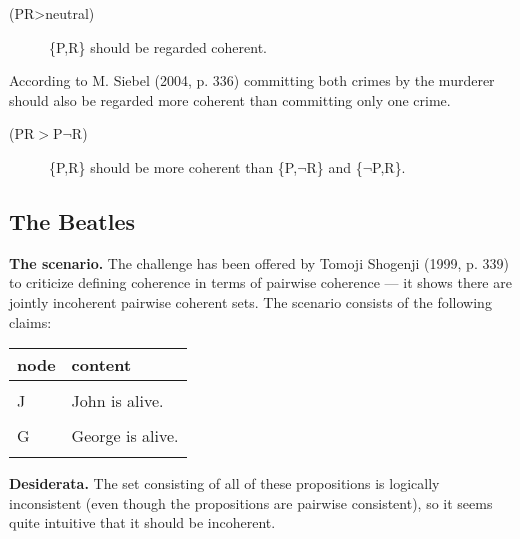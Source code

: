 \documentclass[10pt,]{scrartcl}
\newcommand{\s}[1]{\mbox{\textsf{#1}}}
\begin{document}
\begin{description}
    \item[(\s{PR}\textgreater \s{neutral})] \{\s{P,R}\} should be regarded coherent. 
\end{description}

\vspace{2mm}

According to M. Siebel (2004, p. 336) committing both crimes by the
murderer should also be regarded more coherent than committing only one
crime. \vspace{2mm}

\begin{description}
    \item[(\s{PR}$>$\s{P}$\neg$\s{R})] \{\s{P,R}\} should be more coherent than \{\s{P},$\neg$\s{R}\} and \{$\neg$\s{P},\s{R}\}.
\end{description}

\vspace{2mm}

\subsection{The Beatles}

\textbf{The scenario.} The challenge has been offered by Tomoji Shogenji
(1999, p. 339) to criticize defining coherence in terms of pairwise
coherence --- it shows there are jointly incoherent pairwise coherent
sets. The scenario consists of the following claims:

\begin{table}[H]
\centering
\begin{tabular}{ll}
\toprule
node & content\\
\midrule
\cellcolor{gray!6}{D} & \cellcolor{gray!6}{Exactly one of the Beatles (John, Paul, George and Ringo) is dead.}\\
J & John is alive.\\
\cellcolor{gray!6}{P} & \cellcolor{gray!6}{Paul is alive.}\\
G & George is alive.\\
\cellcolor{gray!6}{R} & \cellcolor{gray!6}{Ringo is alive.}\\
\bottomrule
\end{tabular}
\end{table}

\noindent  \textbf{Desiderata.} The set consisting of all of these
propositions is logically inconsistent (even though the propositions are
pairwise consistent), so it seems quite intuitive that it should be
incoherent. \vspace{2mm}
\end{document}
